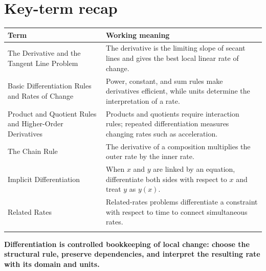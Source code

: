 \documentclass[11pt]{article}
\begin{document}
\section{Key-term recap}
\small
\begin{longtable}{@{}>{\RaggedRight\arraybackslash}p{}>{\RaggedRight\arraybackslash}p{}@{}}
\toprule
\textbf{Term} & \textbf{Working meaning}\\
\midrule\endhead
The Derivative and the Tangent Line Problem & The derivative is the limiting slope of secant lines and gives the best local linear rate of change. \\\addlinespace[2pt]
Basic Differentiation Rules and Rates of Change & Power, constant, and sum rules make derivatives efficient, while units determine the interpretation of a rate. \\\addlinespace[2pt]
Product and Quotient Rules and Higher-Order Derivatives & Products and quotients require interaction rules; repeated differentiation measures changing rates such as acceleration. \\\addlinespace[2pt]
The Chain Rule & The derivative of a composition multiplies the outer rate by the inner rate. \\\addlinespace[2pt]
Implicit Differentiation & When $x$ and $y$ are linked by an equation, differentiate both sides with respect to $x$ and treat $y$ as $y(x)$. \\\addlinespace[2pt]
Related Rates & Related-rates problems differentiate a constraint with respect to time to connect simultaneous rates. \\\addlinespace[2pt]
\bottomrule
\end{longtable}
\normalsize

\enlargethispage{4\baselineskip}
\begin{tcolorbox}[title=One-sentence takeaway,fonttitle=\bfseries,colback=Ink,colframe=Ink,coltext=white,coltitle=white,arc=2mm,boxrule=0pt]
\centering\bfseries Differentiation is controlled bookkeeping of local change: choose the structural rule, preserve dependencies, and interpret the resulting rate with its domain and units.
\end{tcolorbox}
\end{document}
